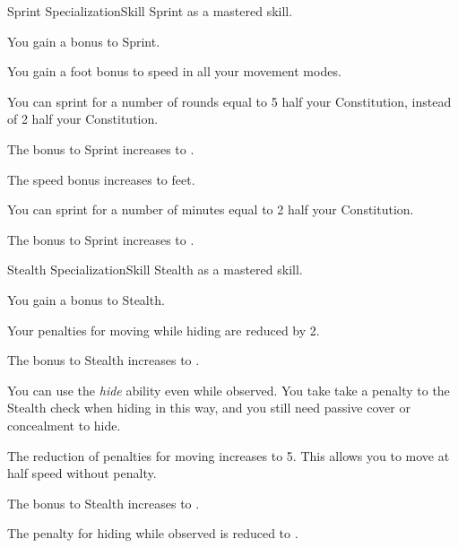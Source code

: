     \begin{feat}{Sprint Specialization}{Skill}
        \featpre Sprint as a mastered skill.
        \featben

         You gain a  bonus to Sprint.

         You gain a  foot bonus to speed in all your movement modes.

         You can sprint for a number of rounds equal to 5 \add half your Constitution, instead of 2 \add half your Constitution.

         The bonus to Sprint increases to .

         The speed bonus increases to  feet.

         You can sprint for a number of minutes equal to 2 \add half your Constitution.

         The bonus to Sprint increases to .
    \end{feat}

    \begin{feat}{Stealth Specialization}{Skill}
        \featpre Stealth as a mastered skill.
        \featben

         You gain a  bonus to Stealth.

        \ff[2]{}

         Your penalties for moving while hiding are reduced by 2. 

         The bonus to Stealth increases to .

         You can use the \textit{hide} ability even while observed.
        You take take a  penalty to the Stealth check when hiding in this way, and you still need passive cover or concealment to hide.

         The reduction of penalties for moving increases to 5.
        This allows you to move at half speed without penalty.

         The bonus to Stealth increases to .

         The penalty for hiding while observed is reduced to .
    \end{feat}

